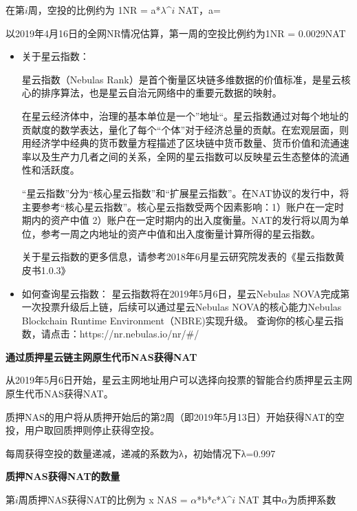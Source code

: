 \begin{enumerate}
	在第$i$周，空投的比例约为 1NR = a*$λ$^$i$ NAT，a=  

	以2019年4月16日的全网NR情况估算，第一周的空投比例约为1NR = 0.0029NAT

\begin{itemize}

	\item 关于星云指数：
	
	星云指数（Nebulas Rank）是首个衡量区块链多维数据的价值标准，是星云核心的排序算法，也是星云自治元网络中的重要元数据的映射。

	在星云经济体中，治理的基本单位是一个”地址“。星云指数通过对每个地址的贡献度的数学表达，量化了每个“个体”对于经济总量的贡献。在宏观层面，则用经济学中经典的货币数量方程描述了区块链中货币数量、货币价值和流通速率以及生产力几者之间的关系，全网的星云指数可以反映星云生态整体的流通性和活跃度。
	
	“星云指数”分为“核心星云指数”和“扩展星云指数”。在NAT协议的发行中，将主要参考“核心星云指数”。核心星云指数受两个因素影响：1）账户在一定时期内的资产中值 2）账户在一定时期内的出入度衡量。NAT的发行将以周为单位，参考一周之内地址的资产中值和出入度衡量计算所得的星云指数。

	关于星云指数的更多信息，请参考2018年6月星云研究院发表的《星云指数黄皮书1.0.3》

	\item 如何查询星云指数：
	星云指数将在2019年5月6日，星云Nebulas NOVA完成第一次投票升级后上链，后续可以通过星云Nebulas NOVA的核心能力Nebulas Blockchain Runtime Environment（NBRE)实现升级。
查询你的核心星云指数，请点击：https://nr.nebulas.io/nr/#/

\end{itemize}

\textbf{通过质押星云链主网原生代币NAS获得NAT}

	从2019年5月6日开始，星云主网地址用户可以选择向投票的智能合约质押星云主网原生代币NAS获得NAT。

	质押NAS的用户将从质押开始后的第2周（即2019年5月13日）开始获得NAT的空投，用户取回质押则停止获得空投。

	每周获得空投的数量递减，递减的系数为λ，初始情况下λ=0.997

	\textbf{质押NAS获得NAT的数量}
	
		第$i$周质押NAS获得NAT的比例为 x NAS = $α$*b*c*$λ$^$i$ NAT
		其中$α$为质押系数



\end{enumerate}
